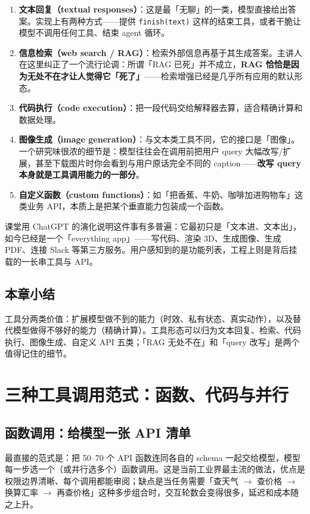 \documentclass[a4paper]{article}
\begin{document}
\begin{enumerate}
\item \textbf{文本回复（textual responses）}：这是最「无聊」的一类，模型直接给出答案。实现上有两种方式——提供 \texttt{finish(text)} 这样的结束工具，或者干脆让模型不调用任何工具、结束 agent 循环。
\item \textbf{信息检索（web search / RAG）}：检索外部信息再基于其生成答案。主讲人在这里纠正了一个流行论调：所谓「RAG 已死」并不成立，\textbf{RAG 恰恰是因为无处不在才让人觉得它「死了」}——检索增强已经是几乎所有应用的默认形态。
\item \textbf{代码执行（code execution）}：把一段代码交给解释器去算，适合精确计算和数据处理。
\item \textbf{图像生成（image generation）}：与文本类工具不同，它的接口是「图像」。一个研究味很浓的细节是：模型往往会在调用前把用户 query 大幅改写/扩展，甚至下载图片时你会看到与用户原话完全不同的 caption——\textbf{改写 query 本身就是工具调用能力的一部分}。
\item \textbf{自定义函数（custom functions）}：如「把香蕉、牛奶、咖啡加进购物车」这类业务 API，本质上是把某个垂直能力包装成一个函数。
\end{enumerate}

课堂用 ChatGPT 的演化说明这件事有多普遍：它最初只是「文本进、文本出」，如今已经是一个「everything app」——写代码、渲染 3D、生成图像、生成 PDF、连接 Slack 等第三方服务。用户感知到的是功能列表，工程上则是背后挂载的一长串工具与 API。

\subsection{本章小结}
工具分两类价值：扩展模型做不到的能力（时效、私有状态、真实动作），以及替代模型做得不够好的能力（精确计算）。工具形态可以归为文本回复、检索、代码执行、图像生成、自定义 API 五类；「RAG 无处不在」和「query 改写」是两个值得记住的细节。

\section{三种工具调用范式：函数、代码与并行}

\subsection{函数调用：给模型一张 API 清单}

最直接的范式是：把 50--70 个 API 函数连同各自的 schema 一起交给模型，模型每一步选一个（或并行选多个）函数调用。这是当前工业界最主流的做法，优点是权限边界清晰、每个调用都能审阅；缺点是当任务需要「查天气 $\rightarrow$ 查价格 $\rightarrow$ 换算汇率 $\rightarrow$ 再查价格」这种多步组合时，交互轮数会变得很多，延迟和成本随之上升。
\end{document}
